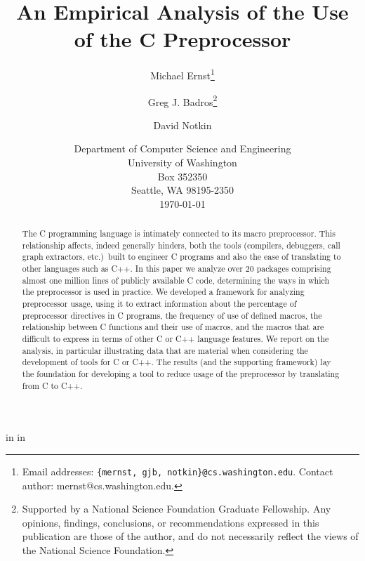 
\marginparwidth 0pt
\oddsidemargin  0pt
\evensidemargin 0pt
\marginparsep 0pt

\topmargin   0pt

 in
 in




\title{An Empirical Analysis of the Use of the C Preprocessor}

\author{Michael Ernst\thanks{Email 
addresses: {\tt \{mernst, gjb, notkin\}@cs.washington.edu}.  Contact author:
mernst@cs.washington.edu.}
\and Greg J. Badros\thanks{Supported by a National Science Foundation
    Graduate Fellowship. Any opinions, findings, conclusions, or
    recommendations expressed in this publication are those of the
    author, and do not necessarily reflect the views of the National
    Science Foundation.} \and David Notkin}

\date{Department of Computer
Science and Engineering\\
University of Washington\\
Box 352350\\
Seattle, WA  98195-2350\\
\today}  

\maketitle


\begin{abstract}

  The C programming language is intimately connected to its macro
  preprocessor.  This relationship affects, indeed generally hinders, both
  the tools (compilers, debuggers, call graph extractors, etc.)\ built to
  engineer C programs and also the ease of translating to other languages
  such as C++.  In this paper we analyze over 20 packages comprising almost
  one million lines of publicly available C code, determining the ways in
  which the preprocessor is used in practice.  We developed a framework for
  analyzing preprocessor usage, using it to extract information about the
  percentage of preprocessor directives in C programs, the frequency of use
  of defined macros, the relationship between C functions and their use of
  macros, and the macros that are difficult to express in terms of other C
  or C++ language features.  We report on the analysis, in particular
  illustrating data that are material when considering the development of
  tools for C or C++.  The results (and the supporting framework) lay the
  foundation for developing a tool to reduce usage of the preprocessor by
  translating from C to C++.

\end{abstract}


